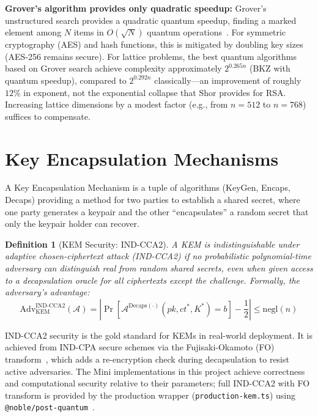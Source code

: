 \documentclass[12pt,a4paper]{report}
\newtheorem{definition}{Definition}[chapter]
\begin{document}
\textbf{Grover's algorithm provides only quadratic speedup:} Grover's unstructured
search provides a quadratic quantum speedup, finding a marked element among $N$ items
in $O(\sqrt{N})$ quantum operations~\cite{bernstein2017}. For symmetric cryptography
(AES) and hash functions, this is mitigated by doubling key sizes (AES-256 remains
secure). For lattice problems, the best quantum algorithms based on Grover search
achieve complexity approximately $2^{0.265n}$ (BKZ with quantum speedup), compared to
$2^{0.292n}$ classically---an improvement of roughly $12\%$ in exponent, not the
exponential collapse that Shor provides for RSA. Increasing lattice dimensions by
a modest factor (e.g., from $n=512$ to $n=768$) suffices to compensate.

\section{Key Encapsulation Mechanisms}

A Key Encapsulation Mechanism is a tuple of algorithms (KeyGen, Encaps, Decaps)
providing a method for two parties to establish a shared secret, where one party
generates a keypair and the other ``encapsulates'' a random secret that only the
keypair holder can recover.

\begin{definition}[KEM Security: IND-CCA2]
A KEM is \emph{indistinguishable under adaptive chosen-ciphertext attack} (IND-CCA2)
if no probabilistic polynomial-time adversary can distinguish real from random shared
secrets, even when given access to a decapsulation oracle for all ciphertexts except
the challenge. Formally, the adversary's advantage:
\[
\text{Adv}^{\text{IND-CCA2}}_\text{KEM}(\mathcal{A}) = \left| \Pr[\mathcal{A}^{\text{Decaps}(\cdot)}(pk, ct^*, K^*) = b] - \frac{1}{2} \right| \leq \text{negl}(n)
\]
\end{definition}

IND-CCA2 security is the gold standard for KEMs in real-world deployment. It is
achieved from IND-CPA secure schemes via the Fujisaki-Okamoto (FO)
transform~\cite{nist2024}, which adds a re-encryption check during decapsulation to
resist active adversaries. The Mini implementations in this project achieve correctness
and computational security relative to their parameters; full IND-CCA2 with FO
transform is provided by the production wrapper (\texttt{production-kem.ts}) using
\texttt{@noble/post-quantum}~\cite{noble_pq}.

\end{document}
